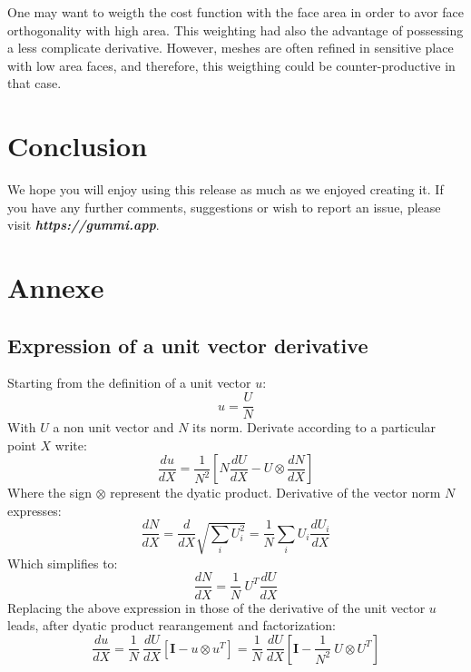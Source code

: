 \documentclass[11pt]{article}
\begin{document}
One may want to weigth the cost function with the face area in order to avor face orthogonality with high area. 
This weighting had also the advantage of possessing a less complicate derivative. 
However, meshes are often refined in sensitive place with low area faces, and therefore, this weigthing could be counter-productive in that case.

\section{Conclusion}

We hope you will enjoy using this release as much as we enjoyed creating it. If you have any further comments, suggestions or wish to report an issue, please visit \emph{\textbf{https://gummi.app}}. 




\section{Annexe}
\subsection{Expression of a unit vector derivative}
Starting from the definition of a unit vector $u$:
\begin{equation}
u = \frac{U}{N}
\end{equation}
With $U$ a non unit vector and $N$ its norm.
Derivate according to a particular point $X$ write:
\begin{equation}
\frac{du}{dX} = \frac{1}{N^2} \left[ N \frac{dU}{dX} - U \otimes \frac{dN}{dX} \right]
\end{equation}
Where the sign $\otimes$ represent the dyatic product. Derivative of the vector norm $N$ expresses:
\begin{equation}
\frac{dN}{dX} = \frac{d}{dX} \sqrt{\sum_i U_i^2} =
\frac{1}{N} \sum_i U_i \frac{dU_i}{dX}
\end{equation}
Which simplifies to:
\begin{equation}
\frac{dN}{dX} = \frac{1}{N}\ U^T \frac{dU}{dX}
\end{equation}
Replacing the above expression in those of the derivative of the unit vector $u$ leads, after dyatic product rearangement and factorization:
\begin{equation}
\frac{du}{dX} = \frac{1}{N}\ \frac{dU}{dX} \left[ \boldsymbol{I} - u \otimes u^T \right] = \frac{1}{N}\ \frac{dU}{dX} \left[ \boldsymbol{I} - \frac{1}{N^2}\ U \otimes U^T \right]
\end{equation}
\end{document}

